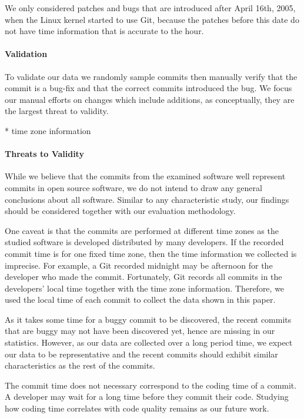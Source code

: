 We only considered patches and bugs that are introduced after April 16th, 2005, when
the Linux kernel started to use Git, because the patches before this date do not have 
time information that is accurate to the hour.

\paragraph{Validation}
To validate our data we randomly sample commits then manually verify
that the commit is a bug-fix and that the correct commits introduced
the bug. We focus our manual efforts on changes which include
additions, as conceptually, they are the largest threat to validity.


* time zone information



\paragraph{Threats to Validity}
While we believe that the commits from the examined software well represent commits in 
open source software, we do not intend to draw any general conclusions about
all software. 
Similar to any characteristic study, our
findings should be considered together with our evaluation methodology.

One caveat is that the commits are performed at different time zones as the studied software is 
developed distributed by many developers. If the recorded commit time is for one fixed time zone,
then the time information we collected is imprecise. For example, a Git recorded midnight may be afternoon
for the developer who made the commit. Fortunately, Git records all commits in the developers' local time 
together with the time zone information. Therefore, we used the local time of each commit to collect 
the data shown in this paper. 

As it takes some time for a buggy commit to be discovered, the recent commits that are buggy may not 
have been discovered yet, hence are missing in our statistics. However, as our data are collected over a long period time, 
we expect our data to be representative and the recent commits should exhibit similar characteristics as the rest of the commits. 

The commit time does not necessary correspond to the coding time of a commit. A developer may wait 
for a long time before they commit their code. Studying how coding time correlates with code quality remains as our future work. 


